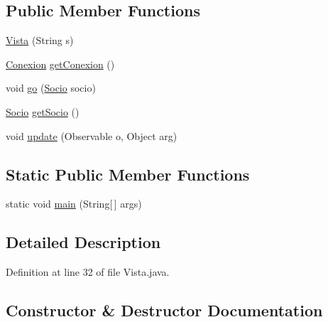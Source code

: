 \subsection*{Public Member Functions}
\begin{DoxyCompactItemize}
\item 
\mbox{\hyperlink{classsociedad2_1_1_vista_aada4eb29ed80892f3c4687e867f77587}{Vista}} (String s)
\item 
\mbox{\hyperlink{classsociedad2_1_1_conexion}{Conexion}} \mbox{\hyperlink{classsociedad2_1_1_vista_a9d018d249c3888a62f7ba905cfb50d3a}{get\+Conexion}} ()
\item 
void \mbox{\hyperlink{classsociedad2_1_1_vista_a103a6cd3dba96b73a7ce663d8c91dce6}{go}} (\mbox{\hyperlink{classsociedad2_1_1_socio}{Socio}} socio)
\item 
\mbox{\hyperlink{classsociedad2_1_1_socio}{Socio}} \mbox{\hyperlink{classsociedad2_1_1_vista_abb81b93cc2a77eec1a011a6b66d2097e}{get\+Socio}} ()
\item 
void \mbox{\hyperlink{classsociedad2_1_1_vista_a48b32507f61975d72ef37f0ee69e5e5c}{update}} (Observable o, Object arg)
\end{DoxyCompactItemize}
\subsection*{Static Public Member Functions}
\begin{DoxyCompactItemize}
\item 
static void \mbox{\hyperlink{classsociedad2_1_1_vista_a9d4ba8e7d2fc1e8f48374eb484ddb76c}{main}} (String\mbox{[}$\,$\mbox{]} args)
\end{DoxyCompactItemize}


\subsection{Detailed Description}


Definition at line 32 of file Vista.\+java.



\subsection{Constructor \& Destructor Documentation}
\mbox{\label{classsociedad2_1_1_vista_aada4eb29ed80892f3c4687e867f77587}} 
